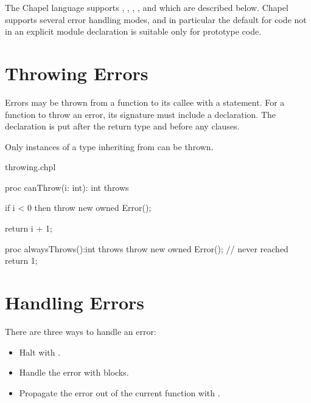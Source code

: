 \label{Error_Handling}

The Chapel language supports , , ,
, and  which are described below. Chapel
supports several error handling modes, and in particular the default for
code not in an explicit module declaration is suitable only for prototype
code.

\section{Throwing Errors}
\label{Throwing_Errors}


Errors may be thrown from a function to its callee with a 
statement. For a function to throw an error, its signature must include
a  declaration. The declaration is put after the return
type and before any  clauses.

Only  instances of a type inheriting from  can be
thrown.

\begin{chapelexample}{throwing.chpl}
\begin{chapel}
proc canThrow(i: int): int throws {
  if i < 0 then
    throw new owned Error();

  return i + 1;
}

proc alwaysThrows():int throws {
  throw new owned Error();
  // never reached
  return 1;
}
\end{chapel}
\begin{chapelpost}
\end{chapelpost}
\begin{chapeloutput}
\end{chapeloutput}
\end{chapelexample}

\section{Handling Errors}
\label{Handling_Errors}

There are three ways to handle an error:

\begin{itemize}
\item Halt with .
\item Handle the error with  blocks.
\item Propagate the error out of the current function with .
\end{itemize}


